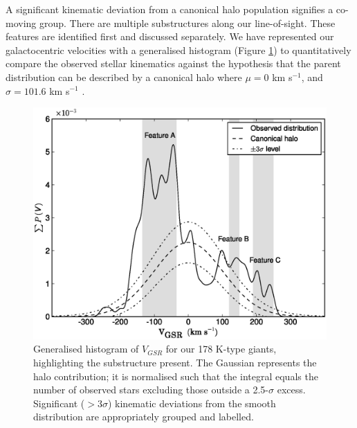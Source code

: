 \documentclass[preprint2]{aastex}
\begin{document}
A significant kinematic deviation from a canonical halo population signifies a co-moving group. There are multiple substructures along our line-of-sight. These features are identified first and discussed separately. We have represented our galactocentric velocities with a generalised histogram (Figure \ref{fig:velocity-histogram}) to quantitatively compare the observed stellar kinematics against the hypothesis that the parent distribution can be described by a canonical halo where $\mu = 0$ km s$^{-1}$, and $\sigma = 101.6$ km s$^{-1}$ \citep{Sirko;et-al_2004}.

	\begin{figure}[h!]
		\includegraphics[width=\columnwidth]{./velocity_halo.eps}
		\caption{Generalised histogram of $V_{GSR}$ for our 178 K-type giants, highlighting the substructure present. The Gaussian represents the halo contribution; it is normalised such that the integral equals the number of observed stars excluding those outside a 2.5-$\sigma$ excess. Significant ($>3\sigma$) kinematic deviations from the smooth distribution are appropriately grouped and labelled.}
		\label{fig:velocity-histogram}
	\end{figure}
	
\end{document}
